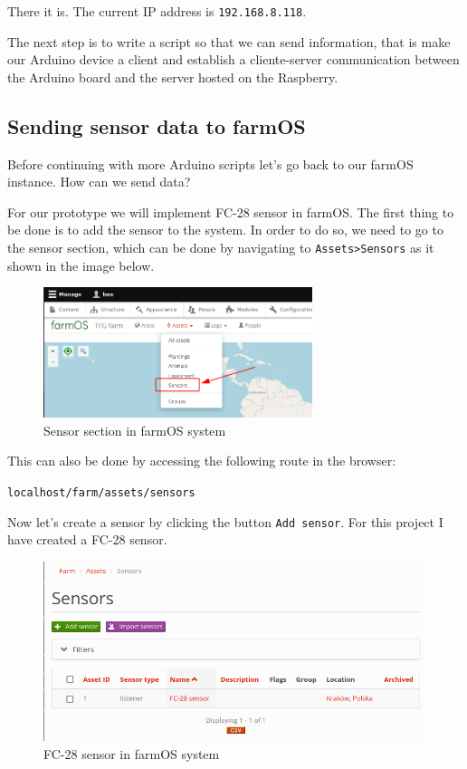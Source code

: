 There it is. The current IP address is \verb|192.168.8.118|.

The next step is to write a script so that we can send information, that is make our Arduino device a client and establish a cliente-server communication between the Arduino board and the server hosted on the Raspberry.

\vspace{7mm}
\subsection{Sending sensor data to farmOS}
Before continuing with more Arduino scripts let's go back to our farmOS instance. How can we send data?

For our prototype we will implement FC-28 sensor in farmOS. The first thing to be done is to add the sensor to the system. In order to do so, we need to go to the sensor section, which can be done by navigating to \verb|Assets>Sensors| as it shown in the image below.

\begin{figure}[H]
    \centering
    \includegraphics[width=0.7\textwidth]{fig/drupal-install/select-sensor.png}
    \caption{Sensor section in farmOS system}
    \label{fig:select-sensor}
\end{figure}

This can also be done by accessing the following route in the browser:

\verb|localhost/farm/assets/sensors|

\vspace{7mm}
Now let's create a sensor by clicking the button \verb|Add sensor|. For this project I have created a FC-28 sensor.

\begin{figure}[H]
    \centering
    \includegraphics[width=1\textwidth]{fig/drupal-install/created-sensor.png}
    \caption{FC-28 sensor in farmOS system}
    \label{fig:created-sensor}
\end{figure}


